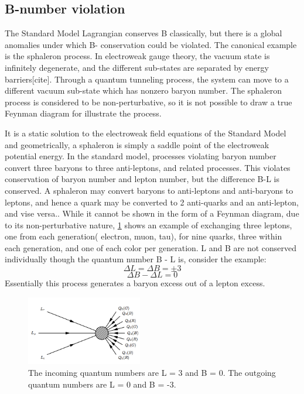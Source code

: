 \subsection{B-number violation}
The Standard Model Lagrangian conserves B classically, but there is a global anomalies under which B- conservation could be violated. The canonical example is the sphaleron process. In electroweak gauge theory, the vacuum state is infinitely degenerate, and the different sub-states are separated by energy barriers[cite]. Through a quantum tunneling process, the system can move to a different vacuum sub-state which has nonzero baryon number.\cite{13}\cite{5} The sphaleron process is considered to be non-perturbative, so it is not possible to draw a true Feynman diagram for illustrate the process.
\par It is a static solution to the electroweak field equations of the Standard Model and geometrically, a sphaleron is simply a saddle point of the electroweak potential energy\cite{8}\cite{13}. In the standard model, processes violating baryon number convert three baryons to three anti-leptons, and related processes. This violates conservation of baryon number and lepton number, but the difference B-L is conserved. A sphaleron may convert baryons to anti-leptons and anti-baryons to leptons, and hence a quark may be converted to 2 anti-quarks and an anti-lepton, and vise versa.\cite{5}. While it cannot be shown in the form of a Feynman diagram, due to its non-perturbative nature, \cref{BL} shows an example of exchanging three leptons, one from each generation( electron, muon, tau), for nine quarks, three within each generation, and one of each color per generation. L and B are not conserved individually though the quantum number B - L is, consider the example\cite{13}:
\begin{equation}
\Delta L = \Delta B = \pm3 
\end{equation}
\begin{equation}
\Delta B - \Delta L = 0
\end{equation}
Essentially this process generates a baryon excess out of a lepton excess. \cite{5}
\begin{figure}[hbt!] \label{BL}
\begin{center}
\includegraphics[width=0.451\textwidth]{figs/bl.png}
\caption{The incoming quantum numbers are L = 3 and B = 0. The outgoing quantum numbers are L = 0 and B = -3.}
\end{center}
\end{figure}
